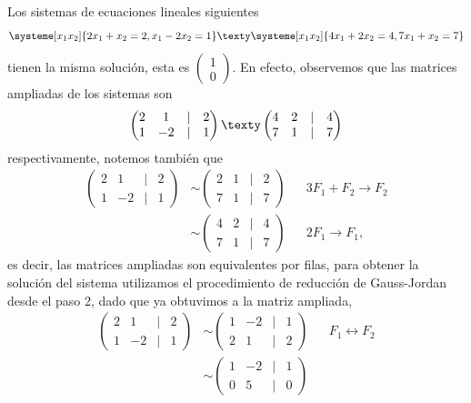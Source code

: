 \documentclass[compacto,10pt]{pubciencias-notas}
\begin{document}
\begin{ejem}\hspace{0pt} 
Los sistemas de ecuaciones lineales siguientes
\[
    \systeme[x_1  x_2]{2x_1 +x_2 = 2,
        x_1 -2x_2 = 1}
    \texty
    \systeme[x_1 x_2]{4x_1 +2x_2 = 4,
        7x_1 +x_2 = 7}
\]
tienen la misma solución, esta es $\begin{pmatrix}1\\0\end{pmatrix}$. En efecto, observemos que las matrices ampliadas de los sistemas son 
\[
    \begin{pmatrix}
    2&1&|&2\\
    1&-2&|&1
    \end{pmatrix}
    \texty
    \begin{pmatrix}
    4&2&|&4\\
    7&1&|&7
    \end{pmatrix}
\]
respectivamente, notemos también que
\begin{align*}
    \begin{pmatrix}
    2&1&|&2\\
    1&-2&|&1
    \end{pmatrix}
    &\sim \begin{pmatrix}
    2&1&|&2\\
    7&1&|&7
    \end{pmatrix}
    && 3F_{1} + F_{2} \to F_{2}\\
    &\sim \begin{pmatrix}
    4&2&|&4\\
    7&1&|&7
    \end{pmatrix}
    && 2F_{1} \to F_{1},
\end{align*}
es decir, las matrices ampliadas son equivalentes por filas, para obtener la solución del sistema utilizamos el procedimiento de reducción de Gauss-Jordan desde el paso 2, dado que ya obtuvimos a la matriz ampliada,
\begin{align*}
    \begin{pmatrix}
    2&1&|&2\\
    1&-2&|&1
    \end{pmatrix}
    &\sim \begin{pmatrix}
    1&-2&|&1\\
    2&1&|&2
    \end{pmatrix}
    && F_{1} \leftrightarrow F_{2}\\
    &\sim \begin{pmatrix}
    1&-2&|&1\\
    0&5&|&0

\end{pmatrix}
\end{align*}
\end{ejem}
\end{document}
